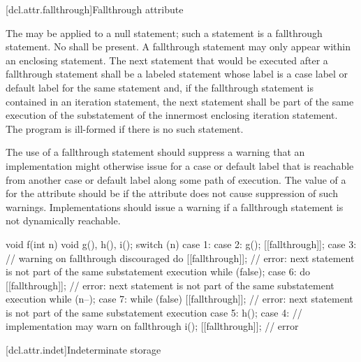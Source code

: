 [dcl.attr.fallthrough]{Fallthrough attribute}

\pnum
The  
may be applied to a null statement;
such a statement is a fallthrough statement.
No  shall be present.
A fallthrough statement may only appear within
an enclosing  statement.
The next statement that would be executed after a fallthrough statement
shall be a labeled statement whose label is a case label or
default label for the same  statement and,
if the fallthrough statement is contained in an iteration statement,
the next statement shall be part of the same execution of
the substatement of the innermost enclosing iteration statement.
The program is ill-formed if there is no such statement.

\pnum
\recommended
The use of a fallthrough statement should suppress
a warning that an implementation might otherwise issue
for a case or default label that is reachable
from another case or default label along some path of execution.
The value of
a  for the  attribute
should be 
if the attribute does not cause suppression of such warnings.
Implementations should issue a warning
if a fallthrough statement is not dynamically reachable.

\pnum
\begin{example}
\begin{codeblock}
void f(int n) {
  void g(), h(), i();
  switch (n) {
  case 1:
  case 2:
    g();
    [[fallthrough]];
  case 3:                       // warning on fallthrough discouraged
    do {
      [[fallthrough]];          // error: next statement is not part of the same substatement execution
    } while (false);
  case 6:
    do {
      [[fallthrough]];          // error: next statement is not part of the same substatement execution
    } while (n--);
  case 7:
    while (false) {
      [[fallthrough]];          // error: next statement is not part of the same substatement execution
    }
  case 5:
    h();
  case 4:                       // implementation may warn on fallthrough
    i();
    [[fallthrough]];            // error
  }
}
\end{codeblock}
\end{example}

[dcl.attr.indet]{Indeterminate storage}

